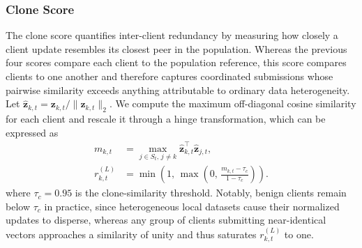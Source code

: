 \documentclass[journal]{IEEEtran}
\begin{document}
\subsubsection{Clone Score}
The clone score quantifies inter-client redundancy by measuring how closely a client update resembles its closest peer in the population. Whereas the previous four scores compare each client to the population reference, this score compares clients to one another and therefore captures coordinated submissions whose pairwise similarity exceeds anything attributable to ordinary data heterogeneity. Let $\hat{\mathbf{z}}_{k,t} = \mathbf{z}_{k,t} / \|\mathbf{z}_{k,t}\|_2$. We compute the maximum off-diagonal cosine similarity for each client and rescale it through a hinge transformation, which can be expressed as
\begin{equation}
\begin{aligned}
m_{k,t} &= \max_{j \in S_t,\, j \neq k} \hat{\mathbf{z}}_{k,t}^{\!\top} \hat{\mathbf{z}}_{j,t}, \\
r_{k,t}^{(L)} &= \min\!\left(1,\, \max\!\left(0,\, \frac{m_{k,t} - \tau_c}{1 - \tau_c}\right)\right).
\end{aligned}
\label{eq:clone_score}
\end{equation}
where $\tau_c = 0.95$ is the clone-similarity threshold. Notably, benign clients remain below $\tau_c$ in practice, since heterogeneous local datasets cause their normalized updates to disperse, whereas any group of clients submitting near-identical vectors approaches a similarity of unity and thus saturates $r_{k,t}^{(L)}$ to one.
\end{document}
